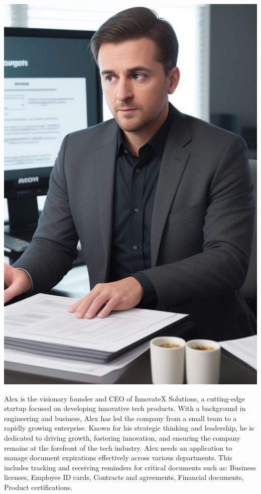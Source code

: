 \begin{minipage}[t]{0.3\textwidth} %
	\vspace{0pt} %
	\centering
	\vspace{0pt}
	\includegraphics[width=\textwidth]{../Draw.io diagrams/alex.jpeg}
\end{minipage}%
\hfill
\begin{minipage}[t]{0.65\textwidth} %
	\vspace{0pt} %
	\vbox{
	Alex is the visionary founder and CEO of InnovateX Solutions, a cutting-edge startup focused on developing innovative tech products. With a background in engineering and business, Alex has led the company from a small team to a rapidly growing enterprise. Known for his strategic thinking and leadership, he is dedicated to driving growth, fostering innovation, and ensuring the company remains at the forefront of the tech industry.
	Alex needs an application to manage document expirations effectively across various departments. This includes tracking and receiving reminders for critical documents such as: Business licenses, Employee ID cards,	Contracts and agreements, Financial documents, Product certifications.
	}
\end{minipage}

